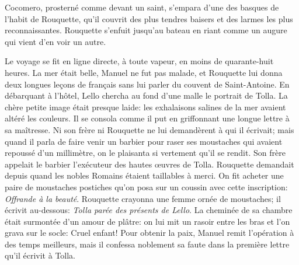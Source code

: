 \enlargethispage{\baselineskip}

Cocomero, prosterné comme devant un saint, s'empara d'une des basques de l'habit de Rouquette, qu'il couvrit des plus tendres baisers et des larmes les plus reconnaissantes. Rouquette s'enfuit jusqu'au bateau en riant comme un augure qui vient d'en voir un autre.

Le voyage se fit en ligne directe, à toute vapeur, en moins de quarante-huit heures. La mer était belle, Manuel ne fut pas malade, et Rouquette lui donna deux longues leçons de français sans lui parler du couvent de Saint-Antoine. En débarquant à l'hôtel, Lello chercha au fond d'une malle le portrait de Tolla. La chère petite image était presque laide: les exhalaisons salines de la mer avaient altéré les couleurs. Il se consola comme il put en griffonnant une longue lettre à sa maîtresse. Ni son frère ni Rouquette ne lui demandèrent à qui il écrivait; mais quand il parla de faire venir un barbier pour raser ses moustaches qui avaient repoussé d'un millimètre, on le plaisanta si vertement qu'il se rendit. Son frère appelait le barbier l'exécuteur des hautes \oe{}uvres de Tolla. Rouquette demandait depuis quand les nobles Romains étaient taillables à merci. On fit acheter une paire de moustaches postiches qu'on posa sur un coussin avec cette inscription: \emph{Offrande à la beauté}. Rouquette crayonna une femme ornée de moustaches; il écrivit au-dessous: \emph{Tolla parée des présents de Lello}. La cheminée de sa chambre était surmontée d'un amour de plâtre: on lui mit un rasoir entre les bras et l'on grava sur le socle: Cruel enfant! Pour obtenir la paix, Manuel remit l'opération à des temps meilleurs, mais il confessa noblement sa faute dans la première lettre qu'il écrivit à Tolla.

